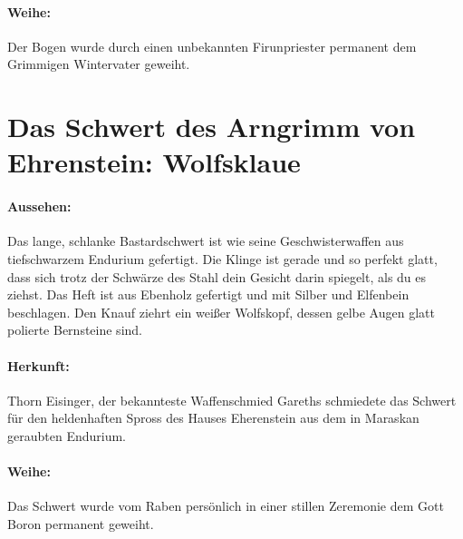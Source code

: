 \paragraph{Weihe:}
Der Bogen wurde durch einen unbekannten Firunpriester permanent dem Grimmigen Wintervater geweiht.

\section{Das Schwert des Arngrimm von Ehrenstein: Wolfsklaue}

\paragraph{Aussehen:}
Das lange, schlanke Bastardschwert ist wie seine Geschwisterwaffen aus tiefschwarzem Endurium gefertigt. Die Klinge ist gerade und so perfekt glatt, dass sich trotz der Schwärze des Stahl dein Gesicht darin spiegelt, als du es ziehst. 
Das Heft ist aus Ebenholz gefertigt und mit Silber und Elfenbein beschlagen. Den Knauf ziehrt ein weißer Wolfskopf, dessen gelbe Augen glatt polierte Bernsteine sind.

\paragraph{Herkunft:}
Thorn Eisinger, der bekannteste Waffenschmied Gareths schmiedete das Schwert für den heldenhaften Spross des Hauses Eherenstein aus dem in Maraskan geraubten Endurium.

\paragraph{Weihe:}
Das Schwert wurde vom Raben persönlich in einer stillen Zeremonie dem Gott Boron permanent geweiht.

